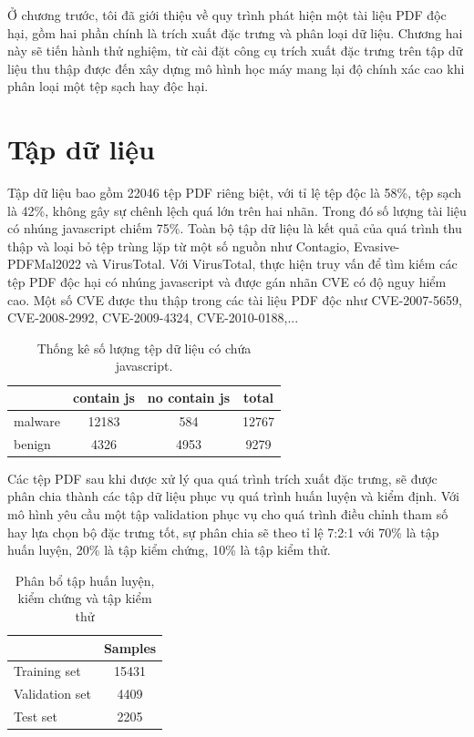 \documentclass[./../main.tex]{subfiles}
\begin{document}
Ở chương trước, tôi đã giới thiệu về quy trình phát hiện một tài liệu PDF độc hại, gồm hai phần chính là trích xuất đặc trưng và phân loại dữ liệu. Chương hai này sẽ tiến hành thử nghiệm, từ cài đặt công cụ trích xuất đặc trưng trên tập dữ liệu thu thập được đến xây dựng mô hình học máy mang lại độ chính xác cao khi phân loại một tệp sạch hay độc hại.

\section{Tập dữ liệu}
Tập dữ liệu bao gồm 22046 tệp PDF riêng biệt, với tỉ lệ tệp độc là 58\%, tệp sạch là 42\%, không gây sự chênh lệch quá lớn trên hai nhãn. Trong đó số lượng tài liệu có nhúng javascript chiếm 75\%. Toàn bộ tập dữ liệu là kết quả của quá trình thu thập và loại bỏ tệp trùng lặp từ một số nguồn như Contagio, Evasive-PDFMal2022 và VirusTotal. Với VirusTotal, thực hiện truy vấn để tìm kiếm các tệp PDF độc hại có nhúng javascript và được gán nhãn CVE có độ nguy hiểm cao. Một số CVE được thu thập trong các tài liệu PDF độc như CVE-2007-5659, CVE-2008-2992, CVE-2009-4324, CVE-2010-0188,...

\begin{table}[]
	\centering
	\caption{Thống kê số lượng tệp dữ liệu có chứa javascript.}
	\label{tab:data_contain_javascript}
	\begin{tabular}{|l|c|c|c|}
		\hline
		        & contain js & no contain js & total \\ \hline
		malware & 12183      & 584           & 12767 \\ \hline
		benign  & 4326       & 4953          & 9279  \\ \hline
	\end{tabular}
\end{table}

Các tệp PDF sau khi được xử lý qua quá trình trích xuất đặc trưng, sẽ được phân chia thành các tập dữ liệu phục vụ quá trình huấn luyện và kiểm định. Với mô hình yêu cầu một tập validation phục vụ cho quá trình điều chỉnh tham số hay lựa chọn bộ đặc trưng tốt, sự phân chia sẽ theo tỉ lệ 7:2:1 với 70\% là tập huấn luyện, 20\% là tập kiểm chứng, 10\% là tập kiểm thử.

\begin{table}[]
	\centering
	\caption{Phân bổ tập huấn luyện, kiểm chứng và tập kiểm thử}
	\label{tab:phan_bo_tap_huan_luyen}
	\begin{tabular}{|l|c|}
		\hline
		               & Samples \\ \hline
		Training set   & 15431   \\ \hline
		Validation set & 4409    \\ \hline
		Test set       & 2205    \\ \hline
	\end{tabular}
\end{table}
\end{document}
